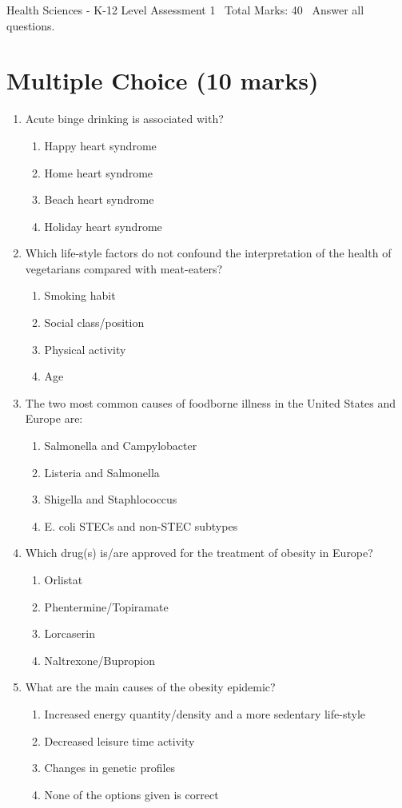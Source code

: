 \documentclass[12pt]{article}
\begin{document}
\begin{center}
Health Sciences - K-12 Level Assessment 1 \
Total Marks: 40 \
Answer all questions.
\end{center}

\section*{Multiple Choice (10 marks)}
\begin{enumerate}[label=\arabic*.]
\item Acute binge drinking is associated with?
\begin{enumerate}[label=(\alph*)]
    \item Happy heart syndrome
    \item Home heart syndrome
    \item Beach heart syndrome
    \item Holiday heart syndrome
\end{enumerate}
\item Which life-style factors do not confound the interpretation of the health of vegetarians compared with meat-eaters?
\begin{enumerate}[label=(\alph*)]
    \item Smoking habit
    \item Social class/position
    \item Physical activity
    \item Age
\end{enumerate}
\item The two most common causes of foodborne illness in the United States and Europe are:
\begin{enumerate}[label=(\alph*)]
    \item Salmonella and Campylobacter
    \item Listeria and Salmonella
    \item Shigella and Staphlococcus
    \item E. coli STECs and non-STEC subtypes
\end{enumerate}
\item Which drug(s) is/are approved for the treatment of obesity in Europe?
\begin{enumerate}[label=(\alph*)]
    \item Orlistat
    \item Phentermine/Topiramate
    \item Lorcaserin
    \item Naltrexone/Bupropion
\end{enumerate}
\item What are the main causes of the obesity epidemic?
\begin{enumerate}[label=(\alph*)]
    \item Increased energy quantity/density and a more sedentary life-style
    \item Decreased leisure time activity
    \item Changes in genetic profiles
    \item None of the options given is correct
\end{enumerate}
\end{enumerate}
\end{document}
